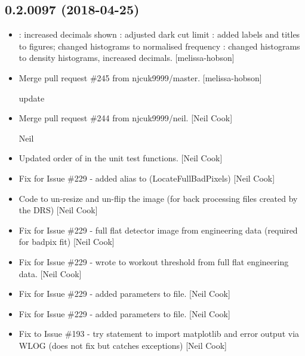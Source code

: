 \documentclass[a4paper,10pt,english]{report}
\begin{document}
\subsection{0.2.0097 (2018-04-25)}
\label{\detokenize{misc/changelog:id455}}\begin{itemize}
\item {} 
: increased decimals shown : adjusted
dark cut limit : added labels and titles to figures;
changed histograms to normalised frequency :
changed histograms to density histograms, increased decimals.
{[}melissa-hobson{]}

\item {} 
Merge pull request \#245 from njcuk9999/master. {[}melissa-hobson{]}

update

\item {} 
Merge pull request \#244 from njcuk9999/neil. {[}Neil Cook{]}

Neil

\item {} 
Updated order of  in the unit test functions. {[}Neil
Cook{]}

\item {} 
Fix for Issue \#229 - added alias to 
(LocateFullBadPixels) {[}Neil Cook{]}

\item {} 
Code to un-resize and un-flip the image (for back processing files
created by the DRS) {[}Neil Cook{]}

\item {} 
Fix for Issue \#229 - full flat detector image from engineering data
(required for badpix fit) {[}Neil Cook{]}

\item {} 
Fix for Issue \#229 - wrote  to workout threshold
from full flat engineering data. {[}Neil Cook{]}

\item {} 
Fix for Issue \#229 - added parameters to  file. {[}Neil
Cook{]}

\item {} 
Fix for Issue \#229 - added parameters to  file. {[}Neil
Cook{]}

\item {} 
Fix to Issue \#193 - try statement to import matplotlib and error
output via WLOG (does not fix but catches exceptions) {[}Neil Cook{]}


\end{itemize}
\end{document}
